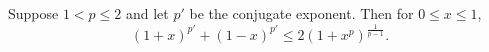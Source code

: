 Suppose $1 < p \leq 2$ and let $p'$ be the conjugate exponent. Then for $0 \leq x \leq 1$,
$$(1 + x)^{p'} + (1 - x)^{p'} \leq 2(1 + x^p)^{\frac{1}{p-1}}.$$
